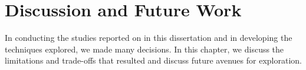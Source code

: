 \setcounter{chapter}{6}


\chapter{Discussion and Future Work}
\label{ch:discussion}

In conducting the studies reported on in
this dissertation and in developing the
techniques explored, we made many decisions.
In this chapter, we discuss the limitations
and trade-offs that resulted and discuss
future avenues for exploration.





 










% 
% 
% 
% 
% 
% 
